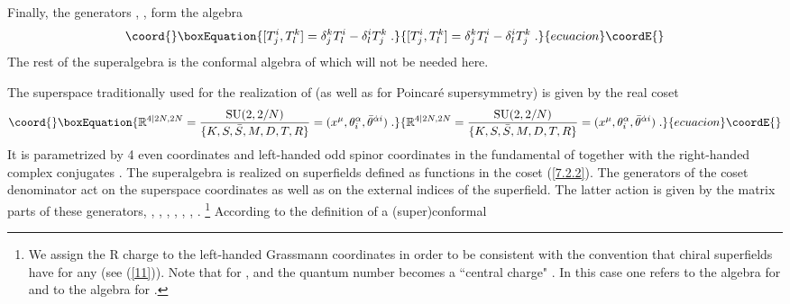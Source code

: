 \documentclass[a4paper,12pt]{article}
\begin{document}
Finally, the \coordHE{} generators \coordHE{}, \coordHE{}, \coordHE{} form the algebra
\begin{equation}\coord{}\boxEquation{\label{5}
 [T^i_j, T^k_l] = \delta^k_j T^i_l - \delta^i_l T^k_j\; .
}{[T^i_j, T^k_l] = \delta^k_j T^i_l - \delta^i_l T^k_j\; .
}{ecuacion}\coordE{}\end{equation}
The rest of the superalgebra \coordHE{} is the  conformal 
algebra of \coordHE{} which will not be needed here. 

The superspace traditionally used for the realization of 
\coordHE{} (as well as for Poincar\'{e} supersymmetry) is 
given by the real coset 
\begin{equation}\coord{}\boxEquation{
{\mathbb R}^{4\vert 2N,2N} = {\mbox{SU}(2,2/N)\over \{K,S,\bar 
S,M,D,T,R\}} = (x^\mu,\theta^{\alpha}_i, \bar\theta^{\dot\alpha 
i})\;. \label{7.2.2} 
}{
{\mathbb R}^{4\vert 2N,2N} = {\mbox{SU}(2,2/N)\over \{K,S,\bar 
S,M,D,T,R\}} = (x^\mu,\theta^{\alpha}_i, \bar\theta^{\dot\alpha 
i})\;. }{ecuacion}\coordE{}\end{equation}
It is parametrized by 4 even coordinates \coordHE{} and \coordHE{} 
left-handed odd spinor coordinates \coordHE{} in the 
fundamental of \coordHE{} together with the \coordHE{} right-handed 
complex conjugates \coordHE{}. The superalgebra is realized on 
superfields \coordHE{} defined as functions in 
the coset (\ref{7.2.2}). The generators of the coset denominator 
\coordHE{} act on the superspace coordinates as well as 
on the external indices of the superfield. The latter action is 
given by the matrix parts of these generators, \coordHE{}, \coordHE{}, \coordHE{}, 
\coordHE{}, \coordHE{}, 
\coordHE{}, \coordHE{}. \footnote{We assign 
the R charge \coordHE{} to the left-handed Grassmann 
coordinates \myHighlight{$\theta^\alpha$}\coordHE{} in order to be consistent with the 
convention that chiral superfields \myHighlight{$\Phi(\theta)$}\coordHE{} have \coordHE{} 
for any \coordHE{} (see (\ref{11})). Note that for \coordHE{}, \coordHE{} 
and the \coordHE{} quantum number becomes a ``central charge" 
\cite{dp,bin}. In this case one refers to the \coordHE{} 
algebra for \coordHE{} and to the \coordHE{} algebra for 
\coordHE{}.} According to the definition of a (super)conformal 
\end{document}
